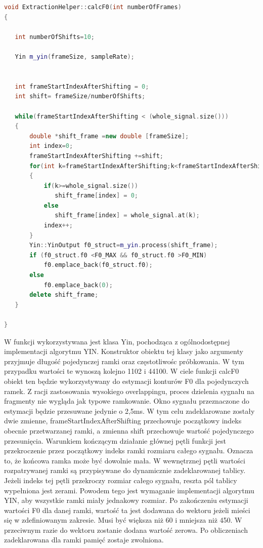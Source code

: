 \documentclass[a4paper,12 pt]{article}
\begin{document}
\FloatBarrier

\begin{lstlisting}[caption={Przedstawienie sposobu dokonywania podziału na ramki, wraz z zastosowaniem overlappingu},label={lst:label},language=C++]
void ExtractionHelper::calcF0(int numberOfFrames)
{

   int numberOfShifts=10;

   Yin m_yin(frameSize, sampleRate);


   int frameStartIndexAfterShifting = 0;
   int shift= frameSize/numberOfShifts;

   while(frameStartIndexAfterShifting < (whole_signal.size()))
   {
       double *shift_frame =new double [frameSize];
       int index=0;
       frameStartIndexAfterShifting +=shift;
       for(int k=frameStartIndexAfterShifting;k<frameStartIndexAfterShifting+frameSize;k++)
       {
           if(k>=whole_signal.size())
              shift_frame[index] = 0;
           else
              shift_frame[index] = whole_signal.at(k);
           index++;
       }
       Yin::YinOutput f0_struct=m_yin.process(shift_frame);
       if (f0_struct.f0 <F0_MAX && f0_struct.f0 >F0_MIN)
           f0.emplace_back(f0_struct.f0);
       else
           f0.emplace_back(0);
       delete shift_frame;
   }

}
\end{lstlisting}
W funkcji wykorzystywana jest klasa Yin, pochodząca z ogólnodostępnej implementacji algorytmu YIN. Konstruktor obiektu tej klasy jako argumenty przyjmuje długość pojedynczej ramki oraz częstotliwośc próbkowania. W tym przypadku wartości te wynoszą kolejno 1102 i 44100. 
W ciele funkcji calcF0 obiekt ten będzie wykorzystywany do estymacji konturów F0 dla pojedynczych ramek. 
Z racji zastosowania wysokiego overlappingu, proces dzielenia sygnału na fragmenty nie wygląda jak typowe ramkowanie. Okno sygnału przeznaczone do estymacji będzie przesuwane jedynie o 2,5ms.
W tym celu zadeklarowane zostały dwie zmienne, frameStartIndexAfterShifting przechowuje początkowy indeks obecnie przetwarzanej ramki, a zmienna shift przechowuje wartość pojedynczego przesunięcia.
Warunkiem kończącym działanie głównej pętli funkcji jest przekroczenie przez początkowy indeks ramki rozmiaru całego sygnału. Oznacza to, że końcowa ramka może być dowolnie mała.
W wewnętrznej pętli wartości rozpatrywanej ramki są przypisywane do dynamicznie zadeklarowanej tablicy. Jeżeli indeks tej pętli przekroczy rozmiar całego sygnału, reszta pól tablicy wypełniona jest zerami. Powodem tego jest wymaganie implementacji algorytmu YIN, aby wszystkie ramki miały jednakowy rozmiar.
Po zakończeniu estymacji wartości F0 dla danej ramki, wartość ta jest dodawana do wektoru jeżeli mieści się w zdefiniowanym zakresie. Musi być większa niż 60 i mniejsza niż 450. W przeciwnym razie do wektoru zostanie dodana wartość zerowa. Po obliczeniach zadeklarowana dla ramki pamięć zostaje zwolniona.
\end{document}
